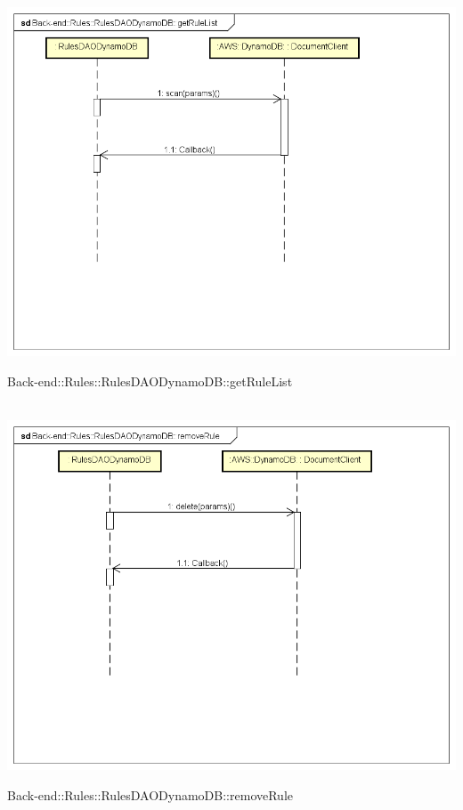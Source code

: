 \\ \includegraphics[width=\textwidth,height=\textheight,keepaspectratio]{images/diagrams/back-end/Ufficial_Backend/Back-end__Rules__RulesDAODynamoDB__getRuleList.png} 	\caption{Back-end::Rules::RulesDAODynamoDB::getRuleList}
\\ \includegraphics[width=\textwidth,height=\textheight,keepaspectratio]{images/diagrams/back-end/Ufficial_Backend/Back-end__Rules__RulesDAODynamoDB__removeRule.png} 	\caption{Back-end::Rules::RulesDAODynamoDB::removeRule}
